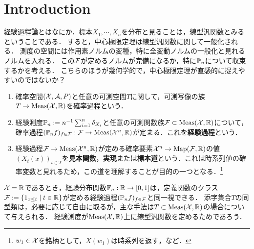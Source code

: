 \documentclass[uplatex,dvipdfmx]{jsreport}
\begin{document}
\section{Introduction}

\begin{tcolorbox}[colframe=ForestGreen, colback=ForestGreen!10!white,breakable,colbacktitle=ForestGreen!40!white,coltitle=black,fonttitle=\bfseries\sffamily,
title=経験過程論]
    経験過程論とはなにか．標本$X_1,\cdots,X_n$を分布と見ることは，線型汎関数とみるということである．
    すると，中心極限定理は線型汎関数に関して一般化される．
    測度の空間には作用素ノルムの変種，特に全変動ノルムの一般化と見れるノルムを入れる．
    この$\mathcal{F}$が定めるノルムが完備になるか，特に$\mathbb{P}_n$について収束するかを考える．
    こちらのほうが幾何学的で，中心極限定理が直感的に捉えやすいのではないか？
\end{tcolorbox}

\begin{definition}\mbox{}
    \begin{enumerate}
        \item 確率空間$(\mathcal{X},\mathcal{A},P)$と任意の可測空間$T$に関して，可測写像の族$T\to\mathrm{Meas}(\mathcal{X},\mathbb{R})$を確率過程という．
        \item 経験測度$\mathbb{P}_n:=n^{-1}\sum_{i=1}^n\delta_{X_i}$と任意の可測関数族$\mathcal{F}\subset\mathrm{Meas}(\mathcal{X},\mathbb{R})$について，確率過程$(\mathbb{P}_nf)_{f\in\mathcal{F}}:\mathcal{F}\to\mathrm{Meas}(\mathcal{X}^n,\mathbb{R})$が定まる．これを\textbf{経験過程}という．
        \item 経験過程$\mathcal{F}\to\mathrm{Meas}(\mathcal{X}^n,\mathbb{R})$が定める確率要素$\mathcal{X}^n\to\mathrm{Map}(\mathcal{F},\mathbb{R})$の値$(X_t(x))_{t\in T}$を\textbf{見本関数}，\textbf{実現}または\textbf{標本道}という．これは時系列値の確率変数と見れるため，この道を理解することが目的の一つとなる．\footnote{$w_1\in\mathcal{X}$を銘柄として，$X(w_1)$は時系列を返す，など．}
    \end{enumerate}
\end{definition}
\begin{remarks}
    $\mathcal{X}=\mathbb{R}$であるとき，経験分布関数$\mathbb{F}_n:\mathbb{R}\to[0,1]$は，定義関数のクラス$\mathcal{F}:=\left\{1_{x\le t}\mid t\in\mathbb{R}\right\}$が定める経験過程$(\mathbb{P}_nf)_{f\in\mathcal{F}}$と同一視できる．
    添字集合$T$の同型類は，必要に応じて自由に取るが，主な手法は$T\subset\mathrm{Meas}(\mathcal{X},\mathbb{R})$の場合について与えられる．
    経験測度が$\mathrm{Meas}(\mathcal{X},\mathbb{R})$上に線型汎関数を定めるためであろう．
\end{remarks}
\end{document}
